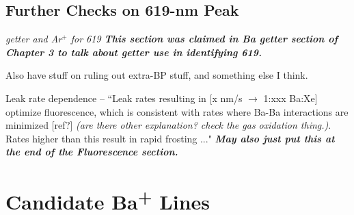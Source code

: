 \subsection{Further Checks on 619-nm Peak}

\emph{\color{gray}getter and Ar$^{+}$ for 619 \textbf{\color{gray}This section was claimed in Ba getter section of Chapter 3 to talk about getter use in identifying 619.}}

Also have stuff on ruling out extra-BP stuff, and something else I think.

Leak rate dependence -- ``Leak rates resulting in [x nm/s $\rightarrow$ 1:xxx Ba:Xe] optimize fluorescence, which is consistent with rates where Ba-Ba interactions are minimized [ref?] \emph{\color{gray}(are there other explanation?  check the gas oxidation thing.)}.  Rates higher than this result in rapid frosting ..." \emph{\textbf{\color{gray}May also just put this at the end of the  Fluorescence section.}}

\section{Candidate Ba\textsuperscript{+} Lines}
\label{sec:BaPlus}